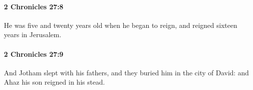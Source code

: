 		\paragraph{2 Chronicles 27:8} %
			\label{2CHRONICLES-27-8}

			He was five and twenty years old when he began to reign, and reigned sixteen years in Jerusalem.


		\paragraph{2 Chronicles 27:9} %
			\label{2CHRONICLES-27-9}

			And Jotham slept with his fathers, and they buried him in the city of David: and Ahaz his son reigned in his stead.

